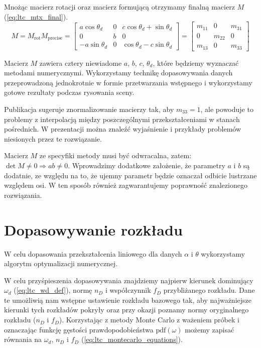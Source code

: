 \documentclass[../main.tex]{subfiles}
\begin{document}
Mnożąc macierz rotacji oraz macierz formującą otrzymamy finalną macierz $M$  (\ref{eq:ltc_mtx_final}).
\begin{equation}
M = M_{\text{rot}} M_{\text{precise}} = \begin{bmatrix}
a\cos\theta_d & 0 & c\cos\theta_d + \sin\theta_d \\
0 & b & 0 \\
-a\sin\theta_d & 0 & \cos\theta_d - c \sin\theta_d
\end{bmatrix} = \begin{bmatrix}
m_{11} & 0 & m_{31} \\
0 & m_{22} & 0 \\
m_{13} & 0 & m_{33}
\end{bmatrix}
\label{eq:ltc_mtx_final}
\end{equation}

Macierz $M$ zawiera cztery niewiadome $a$, $b$, $c$, $\theta_d$, które będziemy wyznaczać metodami numerycznymi. Wykorzystamy technikę dopasowywania danych przeprowadzoną jednokrotnie w formie przetwarzania wstępnego i wykorzystamy gotowe rezultaty podczas rysowania sceny.

Publikacja \cite{ltc_heitz} sugeruje znormalizowanie macierzy tak, aby $m_{33}=1$, ale powoduje to problemy z interpolacją między poszczególnymi przekształceniami w stanach pośrednich. W prezentacji \cite{LTCJourneyPresentation} można znaleźć wyjaśnienie i przykłady problemów niesionych przez te rozwiązanie.

Macierz $M$ ze specyfiki metody musi być odwracalna, zatem: $\det M \neq 0 \Rightarrow ab \neq 0$. Wprowadzimy dodatkowe założenie, że parametry $a$ i $b$ są dodatnie, ze względu na to, że ujemny parametr będzie oznaczał odbicie lustrzane względem osi. W ten sposób również zagwarantujemy poprawność znalezionego rozwiązania.

\section{Dopasowywanie rozkładu}

W celu dopasowania przekształcenia liniowego dla danych $\alpha$ i $\theta$ wykorzystamy algorytm optymalizacji numerycznej.

W celu przyśpieszenia dopasowywania znajdziemy najpierw kierunek dominujący $\omega_d$ (\ref{eq:ltc_wd_def}), normę $n_D$ i współczynnik $f_D$ przybliżanego rozkładu. Dane te umożliwią nam wstępne ustawienie rozkładu bazowego tak, aby najważniejsze kierunki tych rozkładów pokryły oraz przy okazji poznamy normy oryginalnego rozkładu ($n_D$ i $f_D$). Korzystając z metody Monte Carlo z ważeniem próbek i oznaczając funkcję gęstości prawdopodobieństwa $\text{pdf}(\omega)$ możemy zapisać równania na $\omega_d$, $n_D$ i $f_D$ (\ref{eq:ltc_montecarlo_equations}).
    
\end{document}
